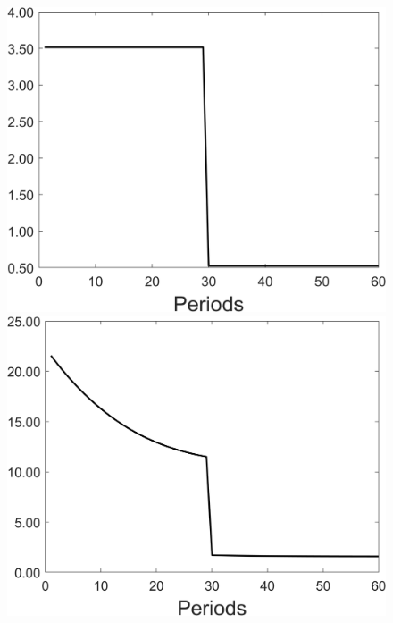\begin{figure}[h!!]
\begin{minipage}[]{0.32\textwidth}
	\end{minipage}
	\begin{minipage}[]{0.32\textwidth}
		\includegraphics[width=1\textwidth]{../codding_model/Own/figures/Rep_agent/staticonlyRam_separate_yd_periods59_eppsilon4.00_zeta1.40_Ad08_Ac04_thetac0.70_thetad0.56_HetGrowth1_tauul0.181_util0_withtarget1_lgd0.png}
	\end{minipage}
	\begin{minipage}[]{0.32\textwidth}
		\includegraphics[width=1\textwidth]{../codding_model/Own/figures/Rep_agent/staticonlyRam_separate_xd_periods59_eppsilon4.00_zeta1.40_Ad08_Ac04_thetac0.70_thetad0.56_HetGrowth1_tauul0.181_util0_withtarget1_lgd0.png}

\end{minipage}
\end{figure}
